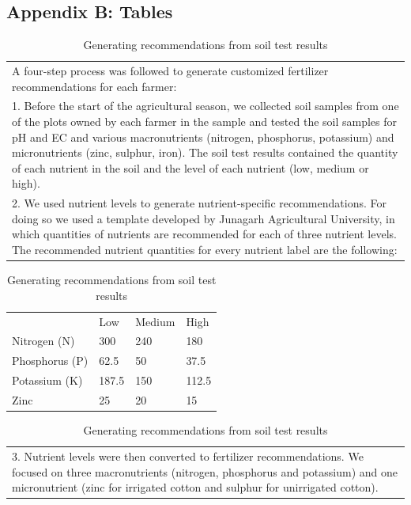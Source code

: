 \documentclass{article}
\begin{document}
\FloatBarrier

\pagebreak
\clearpage

\begin{center}
\section*{Appendix B: Tables}
\end{center}

\setcounter{table}{0}
\renewcommand{\tablename}{}\renewcommand{\thetable}{Appendix Table \arabic{table}}
\FloatBarrier

\begin{table}[!htb] \centering \caption{Generating recommendations from soil test results} \label{t:fertilizer-recommendation-methodology}
\begin{tabularx}{\linewidth}{X}
\hline \hline 
A four-step process was followed to generate customized fertilizer recommendations for each farmer: \\
1. Before the start of the agricultural season, we collected soil samples from one of the plots owned by each farmer in the sample and tested the soil samples for pH and EC and various macronutrients (nitrogen, phosphorus, potassium) and micronutrients (zinc, sulphur, iron). The soil test results contained the quantity of each nutrient in the soil and the level of each nutrient (low, medium or high).\\
2. We used nutrient levels to generate nutrient-specific recommendations. For doing so we used a template developed by Junagarh Agricultural University, in which quantities of nutrients are recommended for each of three nutrient levels. The recommended nutrient quantities for every nutrient label are the following: \\ \hline
\end{tabularx}
\begin{tabularx}{0.5\linewidth}{lXXX}
 & Low & Medium & High \\ 
Nitrogen (N) & 300 & 240 & 180 \\
Phosphorus (P) & 62.5 & 50 & 37.5 \\
Potassium (K) & 187.5 & 150 & 112.5 \\
Zinc & 25 & 20 & 15 \\
\end{tabularx}
\begin{tabularx}{\linewidth}{X}
\hline 
3. Nutrient levels were then converted to fertilizer recommendations. We focused on three macronutrients (nitrogen, phosphorus and potassium) and one micronutrient (zinc for irrigated cotton and sulphur for unirrigated cotton). \\

\end{tabularx}
\end{table}
\end{document}
